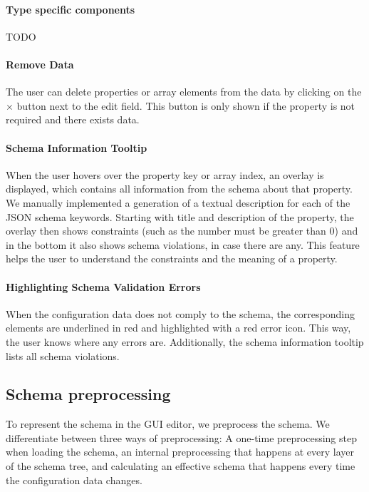 
\paragraph{Type specific components}

TODO

\paragraph{Remove Data}
The user can delete properties or array elements from the data by clicking on the $\times$ button next to the edit field.
This button is only shown if the property is not required and there exists data.

\paragraph{Schema Information Tooltip}
When the user hovers over the property key or array index, an overlay is displayed, which contains all information from the schema about that property.
We manually implemented a generation of a textual description for each of the JSON schema keywords.
Starting with title and description of the property, the overlay then shows constraints (such as the number must be greater than 0) and in the bottom it also shows schema violations, in case there are any.
This feature helps the user to understand the constraints and the meaning of a property.

\paragraph{Highlighting Schema Validation Errors}
When the configuration data does not comply to the schema, the corresponding elements are underlined in red and highlighted with a red error icon.
This way, the user knows where any errors are.
Additionally, the schema information tooltip lists all schema violations.

\subsection{Schema preprocessing}\label{subsec:schema-preprocessing}

To represent the schema in the GUI editor, we preprocess the schema.
We differentiate between three ways of preprocessing:
A one-time preprocessing step when loading the schema, an internal preprocessing that happens at every layer of the schema tree,
and calculating an effective schema that happens every time the configuration data changes.

